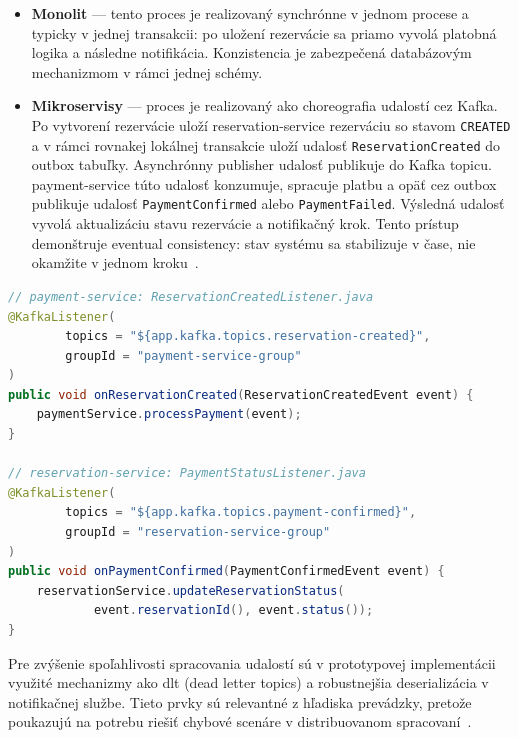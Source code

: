 \begin{itemize}
    \item \textbf{Monolit} — tento proces je realizovaný synchrónne v jednom procese a typicky v jednej transakcii: po uložení rezervácie sa priamo vyvolá platobná logika a následne notifikácia. Konzistencia je zabezpečená databázovým mechanizmom v rámci jednej schémy.
    \item \textbf{Mikroservisy} — proces je realizovaný ako choreografia udalostí cez Kafka. Po vytvorení rezervácie uloží reservation-service rezerváciu so stavom \texttt{CREATED} a v rámci rovnakej lokálnej transakcie uloží udalosť \texttt{Reservation\allowbreak Created} do outbox tabuľky. Asynchrónny publisher udalosť publikuje do Kafka topicu. payment-service túto udalosť konzumuje, spracuje platbu a opäť cez outbox publikuje udalosť \texttt{Payment\allowbreak Confirmed} alebo \texttt{Payment\allowbreak Failed}. Výsledná udalosť vyvolá aktualizáciu stavu rezervácie a notifikačný krok. Tento prístup demonštruje eventual consistency: stav systému sa stabilizuje v čase, nie okamžite v jednom kroku~\cite{Richardson2018}.
\end{itemize}

\begin{lstlisting}[language=Java, breaklines=true, caption={Mikroservisná verzia -- Kafka konzumenti (choreografia sagy)}]
// payment-service: ReservationCreatedListener.java
@KafkaListener(
        topics = "${app.kafka.topics.reservation-created}",
        groupId = "payment-service-group"
)
public void onReservationCreated(ReservationCreatedEvent event) {
    paymentService.processPayment(event);
}

// reservation-service: PaymentStatusListener.java
@KafkaListener(
        topics = "${app.kafka.topics.payment-confirmed}",
        groupId = "reservation-service-group"
)
public void onPaymentConfirmed(PaymentConfirmedEvent event) {
    reservationService.updateReservationStatus(
            event.reservationId(), event.status());
}
\end{lstlisting}

Pre zvýšenie spoľahlivosti spracovania udalostí sú v prototypovej implementácii využité mechanizmy ako \acrshort{dlt} (dead letter topics) a robustnejšia deserializácia v notifikačnej službe. Tieto prvky sú relevantné z hľadiska prevádzky, pretože poukazujú na potrebu riešiť chybové scenáre v distribuovanom spracovaní~\cite{KafkaDocs2025}.

